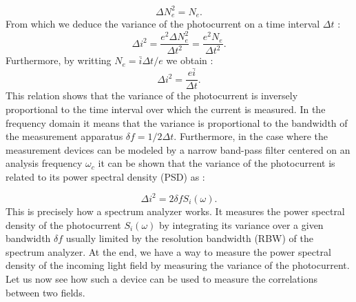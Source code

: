 \begin{equation}
    \label{eq:n_e_variance}
    \Delta N_e^2 = N_e.
\end{equation}
From which we deduce the variance of the photocurrent on a time interval $\Delta t$ :
\begin{equation}
    \label{eq:photocurrent_variance}
    \Delta i^2 = \dfrac{e^2\Delta N_e^2}{\Delta t^2}=\dfrac{e^2N_e}{\Delta t^2}.
\end{equation}
Furthermore, by writting $N_e=\bar{i}\Delta t/e$ we obtain :
\begin{equation}
    \label{eq:photocurrent_variance2}
    \Delta i^2 = \dfrac{e\bar{i}}{\Delta t}.
\end{equation}
This relation shows that the variance of the photocurrent is inversely proportional to the time interval over which the current is measured. In the frequency
domain it means that the variance is proportional to the bandwidth of the measurement apparatus $\delta f=1/2\Delta t$. 
Furthermore, in the case where the measurement devices can be modeled by a narrow band-pass filter centered on an analysis frequency $\omega_c$ it can be shown \cite{fabre_houches_97}
that the variance of the photocurrent is related to its power spectral density (PSD) as :

\begin{equation}
    \label{eq:photocurrent_variance3}
    \Delta i^2 = 2\delta f S_i(\omega).
\end{equation}
This is precisely how a spectrum analyzer works. It measures the power spectral density of the photocurrent $S_i(\omega)$ by integrating its variance over a given bandwidth $\delta f$ usually limited by the resolution 
bandwidth (RBW) of the spectrum analyzer.
At the end, we have a way to measure the power spectral density of the incoming light field by measuring the variance of the photocurrent. 
Let us now see how such a device can be used to measure the correlations between two fields.

